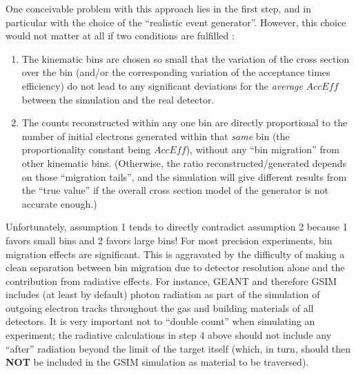 One conceivable problem with this approach lies in the first step, and in particular with the choice of the
``realistic event generator''. However, this choice would not matter at all if two conditions are fulfilled \cite{KuhnEG4ana}:
\begin{enumerate}
\item The kinematic bins are chosen so small that the variation of the cross section over the bin (and/or the
corresponding variation of the acceptance times efficiency) do not lead to any significant deviations for
the {\em average} $Acc Eff$ between the simulation and the real detector. %
\item The counts reconstructed within any one bin are directly proportional to the number of initial electrons generated
within that {\em same} bin (the proportionality constant being $Acc Eff$), without any ``bin migration'' from other 
kinematic bins. (Otherwise, the ratio reconstructed/generated depends on those ``migration tails'', and the simulation
will give different results from the ``true value'' if the overall cross section model of the generator is not accurate enough.)
\end{enumerate}

Unfortunately, assumption 1 tends to directly contradict assumption 2 because 1 favors small bins and 2 favors large bins!  For most precision experiments, %
 bin migration effects are significant. This is aggravated by the difficulty of making %
a clean separation between bin migration due to detector resolution alone and the contribution from radiative effects. For instance, GEANT and therefore GSIM includes (at least by default) photon radiation as part of the simulation of outgoing electron tracks throughout the gas and building materials of all detectors. It is very important not to ``double count'' when simulating an experiment; the radiative calculations in step 4 above should not include any ``after'' radiation beyond the limit of the target itself (which, in turn, should then {\bf NOT} be included in the GSIM simulation as material to be traversed).

